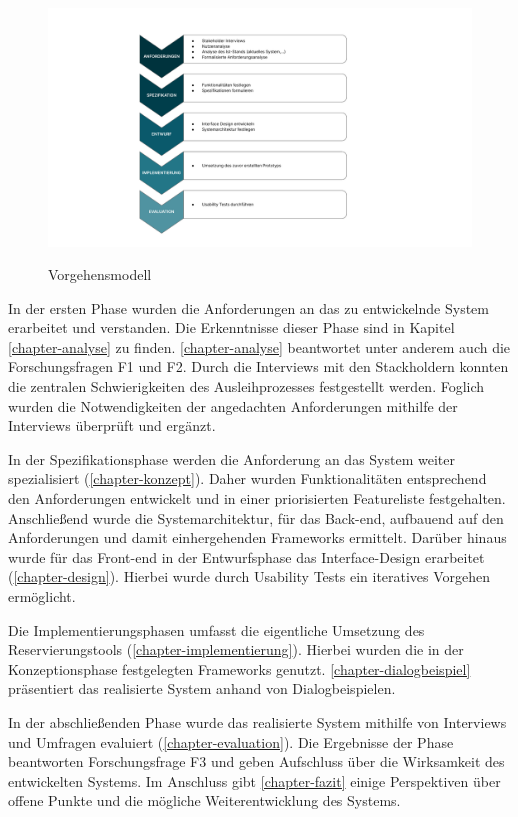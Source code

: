 \begin{figure}[h]
  \centering
  \includegraphics[scale=0.6]{Bilder/Vorgehensmodell.pptx.pdf}
  \label{fig:schablone}
  \caption[Vorgehensmodell]{Vorgehensmodell}
\end{figure}

In der ersten Phase wurden die Anforderungen an das zu entwickelnde System erarbeitet und
verstanden. Die Erkenntnisse dieser Phase sind in Kapitel \ref{chapter-analyse} zu finden.
\ref{chapter-analyse} beantwortet unter anderem auch die Forschungsfragen F1 und F2. Durch die
Interviews mit den Stackholdern konnten die zentralen Schwierigkeiten des Ausleihprozesses
festgestellt werden. Foglich wurden die Notwendigkeiten der angedachten Anforderungen mithilfe der
Interviews überprüft und ergänzt.

In der Spezifikationsphase werden die Anforderung an das System weiter spezialisiert
(\ref{chapter-konzept}). Daher wurden Funktionalitäten entsprechend den Anforderungen entwickelt und
in einer priorisierten Featureliste festgehalten. Anschließend wurde die Systemarchitektur, für das
Back-end, aufbauend auf den Anforderungen und damit einhergehenden Frameworks ermittelt. Darüber
hinaus wurde für das Front-end in der Entwurfsphase das Interface-Design erarbeitet
(\ref{chapter-design}). Hierbei wurde durch Usability Tests ein iteratives Vorgehen ermöglicht.

Die Implementierungsphasen umfasst die eigentliche Umsetzung des Reservierungstools
(\ref{chapter-implementierung}). Hierbei wurden die in der Konzeptionsphase festgelegten Frameworks
genutzt. \ref{chapter-dialogbeispiel} präsentiert das realisierte System anhand von
Dialogbeispielen.

In der abschließenden Phase wurde das realisierte System mithilfe von Interviews und Umfragen
evaluiert (\ref{chapter-evaluation}). Die Ergebnisse der Phase beantworten Forschungsfrage F3 und
geben Aufschluss über die Wirksamkeit des entwickelten Systems. Im Anschluss gibt
\ref{chapter-fazit} einige Perspektiven über offene Punkte und die mögliche Weiterentwicklung des
Systems.